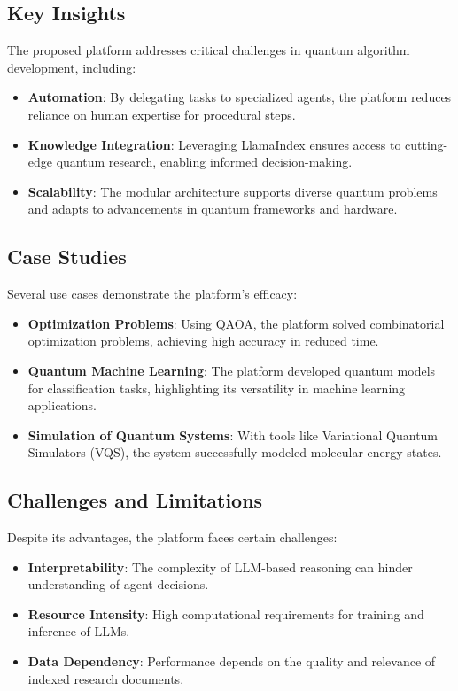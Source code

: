 \documentclass[12pt]{article}
\begin{document}
\subsection{Key Insights}
The proposed platform addresses critical challenges in quantum algorithm development, including:
\begin{itemize}
    \item \textbf{Automation}: By delegating tasks to specialized agents, the platform reduces reliance on human expertise for procedural steps.
    \item \textbf{Knowledge Integration}: Leveraging LlamaIndex ensures access to cutting-edge quantum research, enabling informed decision-making.
    \item \textbf{Scalability}: The modular architecture supports diverse quantum problems and adapts to advancements in quantum frameworks and hardware.
\end{itemize}

\subsection{Case Studies}
Several use cases demonstrate the platform's efficacy:
\begin{itemize}
    \item \textbf{Optimization Problems}: Using QAOA, the platform solved combinatorial optimization problems, achieving high accuracy in reduced time.
    \item \textbf{Quantum Machine Learning}: The platform developed quantum models for classification tasks, highlighting its versatility in machine learning applications.
    \item \textbf{Simulation of Quantum Systems}: With tools like Variational Quantum Simulators (VQS), the system successfully modeled molecular energy states.
\end{itemize}

\subsection{Challenges and Limitations}
Despite its advantages, the platform faces certain challenges:
\begin{itemize}
    \item \textbf{Interpretability}: The complexity of LLM-based reasoning can hinder understanding of agent decisions.
    \item \textbf{Resource Intensity}: High computational requirements for training and inference of LLMs.
    \item \textbf{Data Dependency}: Performance depends on the quality and relevance of indexed research documents.
\end{itemize}
\end{document}
